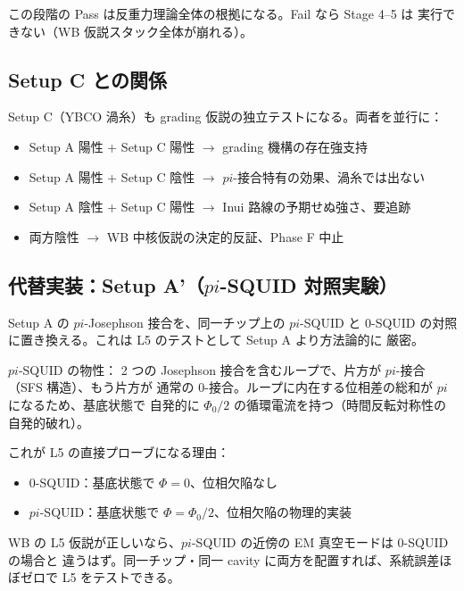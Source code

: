 \documentclass[11pt,a4paper]{article}
\def\pi{pi}%
\def\textbf#1{#1}%
\begin{document}
\textbf{この段階の Pass は反重力理論全体の根拠}になる。Fail なら Stage 4--5 は
実行できない（WB 仮説スタック全体が崩れる）。

\subsection{Setup C との関係}

Setup C（YBCO 渦糸）も grading 仮説の独立テストになる。両者を並行に：

\begin{itemize}
\item Setup A 陽性 + Setup C 陽性 $\to$ grading 機構の存在強支持
\item Setup A 陽性 + Setup C 陰性 $\to$ $\pi$-接合特有の効果、渦糸では出ない
\item Setup A 陰性 + Setup C 陽性 $\to$ Inui 路線の予期せぬ強さ、要追跡
\item 両方陰性 $\to$ \textbf{WB 中核仮説の決定的反証}、Phase F 中止
\end{itemize}

\subsection{代替実装：Setup A'（$\pi$-SQUID 対照実験）}

Setup A の $\pi$-Josephson 接合を、\textbf{同一チップ上の $\pi$-SQUID と 0-SQUID
の対照}に置き換える。これは L5 のテストとして \textbf{Setup A より方法論的に
厳密}。

\begin{theorybox}
\textbf{$\pi$-SQUID の物性}：
2 つの Josephson 接合を含むループで、片方が $\pi$-接合（SFS 構造）、もう片方が
通常の 0-接合。ループに内在する位相差の総和が $\pi$ になるため、基底状態で
\textbf{自発的に $\Phi_0/2$ の循環電流}を持つ（時間反転対称性の自発的破れ）。

\textbf{これが L5 の直接プローブになる理由}：
\begin{itemize}
\item 0-SQUID：基底状態で $\Phi = 0$、位相欠陥なし
\item $\pi$-SQUID：基底状態で $\Phi = \Phi_0/2$、\textbf{位相欠陥の物理的実装}
\end{itemize}
WB の L5 仮説が正しいなら、$\pi$-SQUID の近傍の EM 真空モードは 0-SQUID の場合と
違うはず。同一チップ・同一 cavity に両方を配置すれば、\textbf{系統誤差ほぼゼロ}で
L5 をテストできる。
\end{theorybox}
\end{document}

